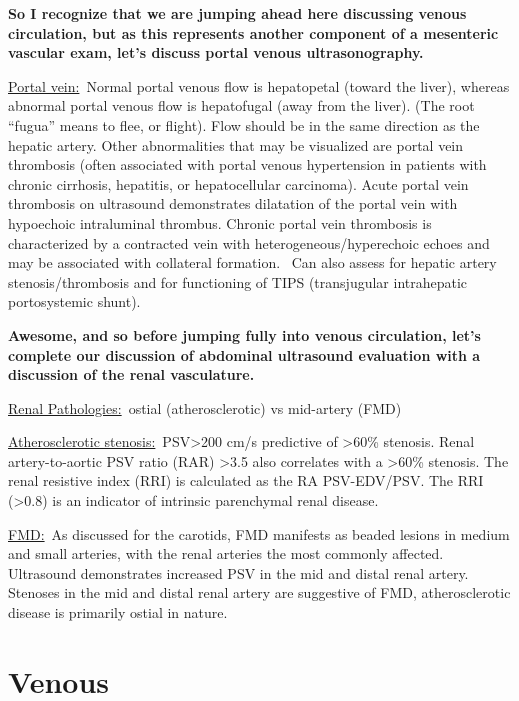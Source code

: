 \documentclass[
]{book}
\begin{document}
\textbf{So I recognize that we are jumping ahead here discussing venous
circulation, but as this represents another component of a mesenteric
vascular exam, let's discuss portal venous ultrasonography.}

\underline{Portal vein:}~Normal portal venous flow is hepatopetal (toward the
liver), whereas abnormal portal venous flow is hepatofugal (away from
the liver). (The root ``fugua'' means to flee, or flight). Flow should be
in the same direction as the hepatic artery. Other abnormalities that
may be visualized are portal vein thrombosis (often associated with
portal venous hypertension in patients with chronic cirrhosis,
hepatitis, or hepatocellular carcinoma). Acute portal vein thrombosis on
ultrasound demonstrates dilatation of the portal vein with hypoechoic
intraluminal thrombus. Chronic portal vein thrombosis is characterized
by a contracted vein with heterogeneous/hyperechoic echoes and may be
associated with collateral formation.~ Can also assess for hepatic
artery stenosis/thrombosis and for functioning of TIPS (transjugular
intrahepatic portosystemic shunt).

\textbf{Awesome, and so before jumping fully into venous circulation, let's
complete our discussion of abdominal ultrasound evaluation with a
discussion of the renal vasculature.}

\underline{Renal Pathologies:}~ostial (atherosclerotic) vs mid-artery (FMD)

\underline{Atherosclerotic stenosis:}~PSV\textgreater200 cm/s predictive of \textgreater60\%
stenosis. Renal artery-to-aortic PSV ratio (RAR) \textgreater3.5 also correlates
with a \textgreater60\% stenosis. The renal resistive index (RRI) is calculated as
the RA PSV-EDV/PSV. The RRI (\textgreater0.8) is an indicator of intrinsic
parenchymal renal disease.

\underline{FMD:}~As discussed for the carotids, FMD manifests as beaded
lesions in medium and small arteries, with the renal arteries the most
commonly affected. Ultrasound demonstrates increased PSV in the mid and
distal renal artery. Stenoses in the mid and distal renal artery are
suggestive of FMD, atherosclerotic disease is primarily ostial in
nature.

\hypertarget{venous}{%
\section{Venous}\label{venous}}
\end{document}
